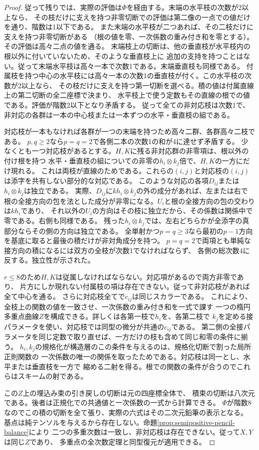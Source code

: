 \begin{proof}
従って残りでは、実際の評価は$\Phi$を経由する。末端の水平枝の次数が2以上なら、
その枝だけに支えを持つ非零切断での評価は第二像の一点での値だけを通り、階数は1以下である。
また末端の水平枝が二つあれば、その二枝だけに支えを持つ非零切断がある
（根の値を零、一次係数の重み付き和を零とする）。その評価は高々二点の値を通る。
末端枝上の切断は、他の垂直枝が水平枝内の根以外に付いていないため、そのような垂直枝上に
追加の支持を持つことはない。従って末端水平枝は高々一本で次数1である。末端垂直枝も同様である。
付属枝を持つ中心の水平枝には高々一本の次数1の垂直枝が付く。この水平枝の次数が2以上なら、
その枝だけに支えを持つ第一切断を選べる。積の値は付属直線上の第二切断の全二座標で決まり、
水平枝上で使う定数もその直線の根での値である。評価が階数2以下となり矛盾する。
従って全ての非対応枝は次数1で、非対応の各群は一本の中心枝または一本ずつの水平・垂直枝の組である。

対応枝が一本もなければ各群が一つの末端を持つため高々二群、各群高々二枝である。
$p,q\ge2$なら$p=q=2$で各側二本の次数1の和が4に達せず矛盾する。
少なくとも一つ対応枝があるとする。$H,K$に残る非対応群の非零項は、根以外の付け根を持つ
水平・垂直枝の組についての非零の$h_i\otimes k_j$倍で、$H,K$の一方にだけ現れる。
これは両枝が直線のためである。これらの$(i,j)$と対応枝の$(i,j)$は添字を共有しない部分的な対応である。
このような対応の各項$D_{ij}$または$h_i\otimes k_j$は独立である。
実際、$D_{ij}$に$kh_i\otimes k_j$の外の成分があれば、左または右で
根の全接方向の包を法とした成分が非零になる。$U_i$と根の全接方向の包の交わりは$kh_i$であり、
それ以外の$U_i$の方向はその枝に独立だから、その係数は関係中で零である。右側も同様である。
残った$h_i\otimes k_j$では、左右どちらかが全添字の真部分ならその側の方向は独立である。
全単射かつ$p=q\ge3$なら最初の$p-1$方向を基底に取ると最後の積だけが非対角成分を持つ。
$p=q=2$で両項とも単純な接方向の積になるには双方の全枝が次数1でなければならず、
各側の総次数4に反する。独立性が示された。

$r\le8$のため$H,K$は従属しなければならない。対応項があるので両方非零であり、
片方にしか現れない付属枝の項は存在できない。従って非対応枝があれば全て中心を通る。
さらに対応枝全てで$c_{ij}$は同じスカラーである。
これにより、全枝上の関数の値を一致させ、一次係数の重み付き和を一式で課す
一つの楕円多重点曲線$Z$を構成できる。詳しくは各第一枝で$h_i$を、各第二枝で
$k_j$を定める接パラメータを使い、対応枝では同型の微分が共通の$c_{ij}$である。
第二側の全接パラメータを同じ定数で取り直せば、一方だけの枝も含めて同じ和零の条件に揃う。
$h_i,k_j$の規格化が構造層のこの条件を与えるのは、規格化切断で割った局所正則関数の
一次係数の唯一の関係を取ったためである。対応枝は同一とし、水平または垂直枝を一方で
縮める二射を得る。根での関数の条件が合うのでこれらはスキームの射である。

この$Z$上の埋込み束の引き戻しの切断は元の四座標全体で、
積束の切断は八次元である。後者は正規化での共通値と一次係数の一式から計算できる。
$\Phi$が階数8なのでこの積の切断を全て張り、実際の六式はその二次元鉛筆の表示となる。
基点は純テンソルを与えるから存在しない。命題\ref{prop:semipositive-pencil-balance}により
二つの多重次数は一致し、非対応枝は存在できない。従って$X,Y$は同じ$Z$であり、
多重点の全次数定理と同型復元が適用できる。
\end{proof}

